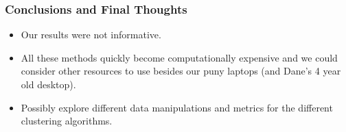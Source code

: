 \documentclass{beamer}
\begin{document}
\begin{frame}
	\frametitle{Conclusions and Final Thoughts}
\begin{itemize}
\item Our results were not informative.\\
\item All these methods quickly become computationally expensive and we could consider other resources to use besides our puny laptops (and Dane's 4 year old desktop). \\ 
\item  Possibly explore different data manipulations and  metrics for the different clustering algorithms.  \\
\end{itemize}
\end{frame}
\end{document}
